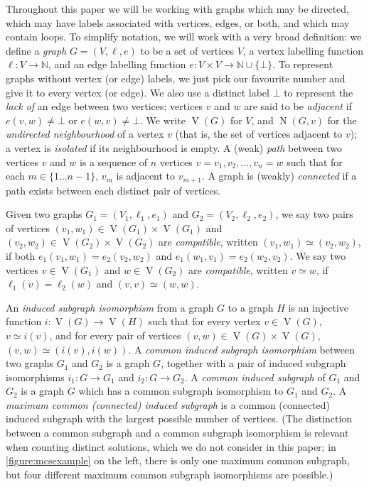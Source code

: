 \documentclass{llncs}
\begin{document}
Throughout this paper we will be working with graphs which may be directed, which may have labels
associated with vertices, edges, or both, and which may contain loops. To simplify notation, we will
work with a very broad definition: we define a \emph{graph} $G = (V, \ell, e)$ to be a set of
vertices $V$, a vertex labelling function $\ell : V \rightarrow \mathbb{N}$, and an edge labelling
function $e : V \times V \rightarrow \mathbb{N} \cup \{ \bot \}$. To represent graphs without vertex
(or edge) labels, we just pick our favourite number and give it to every vertex (or edge). We also
use a distinct label $\bot$ to represent the \emph{lack of} an edge between two vertices; vertices
$v$ and $w$ are said to be \emph{adjacent} if $e(v, w) \ne \bot$ or $e(w, v) \ne \bot$. We write
$\operatorname{V}(G)$ for $V$, and $\operatorname{N}(G, v)$ for the \emph{undirected neighbourhood}
of a vertex $v$ (that is, the set of vertices adjacent to $v$); a vertex is \emph{isolated} if its
neighbourhood is empty. A (weak) \emph{path} between two vertices $v$ and $w$ is a sequence of $n$
vertices $v = v_1, v_2, \ldots, v_n = w$ such that for each $m \in \{ 1 \ldots n - 1 \}$, $v_m$ is
adjacent to $v_{m + 1}$. A graph is (weakly) \emph{connected} if a path exists between each distinct
pair of vertices.

Given two graphs $G_1 = (V_1, \ell_1, e_1)$ and $G_2 = (V_2, \ell_2, e_2)$, we say two pairs of
vertices $(v_1, w_1) \in \operatorname{V}(G_1) \times \operatorname{V}(G_1)$ and $(v_2, w_2) \in
\operatorname{V}(G_2) \times \operatorname{V}(G_2)$ are \emph{compatible}, written $(v_1, w_1)
\simeq (v_2, w_2)$, if both $e_1(v_1, w_1) = e_2(v_2, w_2)$ and $e_1(w_1, v_1) = e_2(w_2, v_2)$. We
say two vertices $v \in \operatorname{V}(G_1)$ and $w \in \operatorname{V}(G_2)$ are
\emph{compatible}, written $v \simeq w$, if $\ell_1(v) = \ell_2(w)$ and $(v, v) \simeq (w, w)$.

An \emph{induced subgraph isomorphism} from a graph $G$ to a graph $H$ is an injective function $i :
\operatorname{V}(G) \rightarrow \operatorname{V}(H)$ such that for every vertex $v \in
\operatorname{V}(G)$, $v \simeq i(v)$, and for every pair of vertices $(v, w) \in
\operatorname{V}(G) \times \operatorname{V}(G)$, $(v, w) \simeq (i(v), i(w))$. A \emph{common
induced subgraph isomorphism} between two graphs $G_1$ and $G_2$ is a graph $G$, together with a
pair of induced subgraph isomorphisms $i_1 : G \rightarrow G_1$ and $i_2 : G \rightarrow G_2$. A
\emph{common induced subgraph} of $G_1$ and $G_2$ is a graph $G$ which has a common subgraph
isomorphism to $G_1$ and $G_2$. A \emph{maximum common (connected) induced subgraph} is a common
(connected) induced subgraph with the largest possible number of vertices.  (The distinction between
a common subgraph and a common subgraph isomorphism is relevant when counting distinct solutions,
which we do not consider in this paper; in \cref{figure:mcsexample} on the left, there is only one
maximum common subgraph, but four different maximum common subgraph isomorphisms are possible.)
\end{document}
